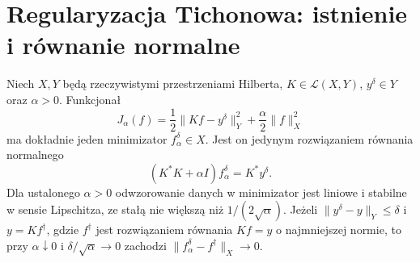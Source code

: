 \section{Regularyzacja Tichonowa: istnienie i równanie normalne}
\begin{twierdzenie}\label{thm:pde32-tikhonov}
Niech $X,Y$ będą rzeczywistymi przestrzeniami Hilberta,
$K\in\mathcal L(X,Y)$, $y^\delta\in Y$ oraz $\alpha>0$.
Funkcjonał
\begin{equation}\label{eq:pde32-tikhonov}
 J_\alpha(f)=\frac12\|Kf-y^\delta\|_Y^2
 +\frac\alpha2\|f\|_X^2
\end{equation}
ma dokładnie jeden minimizator $f_\alpha^\delta\in X$.
Jest on jedynym rozwiązaniem równania normalnego
\begin{equation}\label{eq:pde32-normal}
 (K^*K+\alpha I)f_\alpha^\delta=K^*y^\delta.
\end{equation}
Dla ustalonego $\alpha>0$ odwzorowanie danych
w minimizator jest liniowe i stabilne w sensie
Lipschitza, ze stałą nie większą niż $1/(2\sqrt\alpha)$.
Jeżeli $\|y^\delta-y\|_Y\le\delta$ i $y=Kf^\dagger$,
gdzie $f^\dagger$ jest rozwiązaniem równania $Kf=y$
o najmniejszej normie, to przy $\alpha\downarrow0$
i $\delta/\sqrt\alpha\to0$ zachodzi
$\|f_\alpha^\delta-f^\dagger\|_X\to0$.
\end{twierdzenie}
